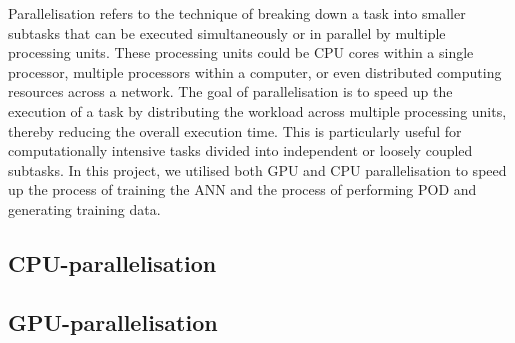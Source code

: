Parallelisation refers to the technique of breaking down a task into smaller subtasks that can be executed simultaneously or in parallel by multiple processing units. These processing units could be CPU cores within a single processor, multiple processors within a computer, or even distributed computing resources across a network. The goal of parallelisation is to speed up the execution of a task by distributing the workload across multiple processing units, thereby reducing the overall execution time. This is particularly useful for computationally intensive tasks divided into independent or loosely coupled subtasks. In this project, we utilised both GPU and CPU parallelisation to speed up the process of training the ANN and the process of performing POD and generating training data. 

\subsection{CPU-parallelisation}

\subsection{GPU-parallelisation}

\newpage

